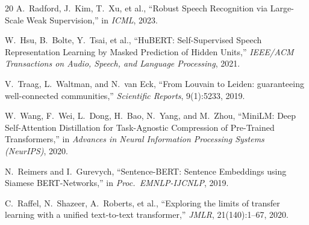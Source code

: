 \documentclass[11pt,a4paper,twocolumn]{article}
\begin{document}
\begin{thebibliography}{20}
A.~Radford, J.~Kim, T.~Xu, et al., ``Robust Speech Recognition via Large-Scale Weak Supervision,'' in \textit{ICML}, 2023.

W.~Hsu, B.~Bolte, Y.~Tsai, et al., ``HuBERT: Self-Supervised Speech Representation Learning by Masked Prediction of Hidden Units,'' \textit{IEEE/ACM Transactions on Audio, Speech, and Language Processing}, 2021.

V.~Traag, L.~Waltman, and N.~van Eck, ``From Louvain to Leiden: guaranteeing well-connected communities,'' \textit{Scientific Reports}, 9(1):5233, 2019.

W.~Wang, F.~Wei, L.~Dong, H.~Bao, N.~Yang, and M.~Zhou, ``MiniLM: Deep Self-Attention Distillation for Task-Agnostic Compression of Pre-Trained Transformers,'' in \textit{Advances in Neural Information Processing Systems (NeurIPS)}, 2020.

N.~Reimers and I.~Gurevych, ``Sentence-BERT: Sentence Embeddings using Siamese BERT-Networks,'' in \textit{Proc.\ EMNLP-IJCNLP}, 2019.

C.~Raffel, N.~Shazeer, A.~Roberts, et al., ``Exploring the limits of transfer learning with a unified text-to-text transformer,'' \textit{JMLR}, 21(140):1--67, 2020.

\end{thebibliography}
\end{document}
